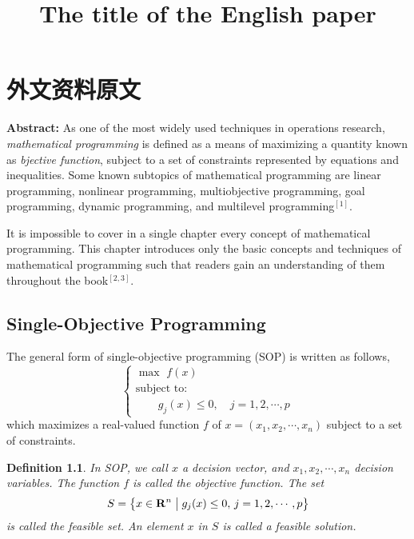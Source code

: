 \chapter{外文资料原文}
\label{cha:engorg}

\title{The title of the English paper}

\textbf{Abstract:} As one of the most widely used techniques in operations
research, \emph{ mathematical programming} is defined as a means of maximizing a
quantity known as \emph{bjective function}, subject to a set of constraints
represented by equations and inequalities. Some known subtopics of mathematical
programming are linear programming, nonlinear programming, multiobjective
programming, goal programming, dynamic programming, and multilevel
programming$^{[1]}$.

It is impossible to cover in a single chapter every concept of mathematical
programming. This chapter introduces only the basic concepts and techniques of
mathematical programming such that readers gain an understanding of them
throughout the book$^{[2,3]}$.


\section{Single-Objective Programming}
The general form of single-objective programming (SOP) is written
as follows,
\begin{equation*} %
\left\{\begin{array}{l}
\max \,\,f(x)\\[0.1 cm]
\mbox{subject to:} \\ [0.1 cm]
\qquad g_j(x)\le 0,\quad j=1,2,\cdots,p
\end{array}\right.
\end{equation*}
which maximizes a real-valued function $f$ of
$x=(x_1,x_2,\cdots,x_n)$ subject to a set of constraints.

\newcommand\Real{\mathbf{R}}
\newtheorem{mpdef}{Definition}[chapter]
\begin{mpdef}
In SOP, we call $x$ a decision vector, and
$x_1,x_2,\cdots,x_n$ decision variables. The function
$f$ is called the objective function. The set
\begin{equation*}
S=\left\{x\in\Real^n\bigm|g_j(x)\le 0,\,j=1,2,\cdots,p\right\}
\end{equation*}
is called the feasible set. An element $x$ in $S$ is called a
feasible solution.
\end{mpdef}

